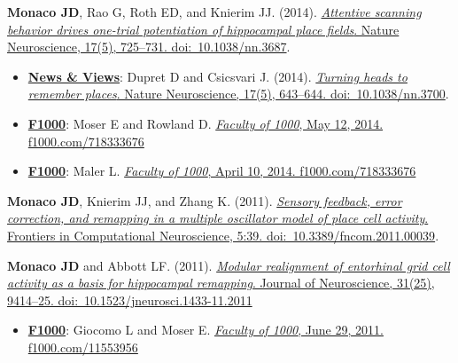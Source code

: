 \documentclass[10pt]{article}
\begin{document}
\begin{description}
\item \textbf{Monaco JD}, Rao G, Roth ED, and Knierim JJ. (2014). \href{http://dx.doi.org/10.1038/nn.3687}{\emph{Attentive scanning behavior drives one-trial potentiation of hippocampal place fields}. Nature Neuroscience, 17(5), 725--731. doi:~10.1038/nn.3687}.
\begin{itemize}
  \item \underline{\bf News \& Views}: Dupret D and Csicsvari J. (2014). \href{http://dx.doi.org/10.1038/nn.3700}{\emph{Turning heads to remember places}. Nature Neuroscience, 17(5), 643--644. doi:~10.1038/nn.3700}.
    \item \underline{\bf F1000}: Moser E and Rowland D. \href{http://f1000prime.com/718333676#eval793494783}{\emph{Faculty of 1000}, May 12, 2014. f1000.com/718333676}
    \item \underline{\bf F1000}: Maler L. \href{http://f1000prime.com/718333676#eval793493493}{\emph{Faculty of 1000}, April 10, 2014. f1000.com/718333676}
\end{itemize}
\item \textbf{Monaco JD}, Knierim JJ, and Zhang K. (2011). \href{http://dx.doi.org/10.3389/fncom.2011.00039}{\emph{Sensory feedback, error correction, and remapping in a multiple oscillator model of place cell activity}. Frontiers in Computational Neuroscience, 5:39. doi:~10.3389/fncom.2011.00039}.
\item \textbf{Monaco JD} and Abbott LF. (2011). \href{http://dx.doi.org/10.1523/JNEUROSCI.1433-11.2011}{\emph{Modular realignment of entorhinal grid cell activity as a basis for hippocampal remapping}. Journal of Neuroscience, 31(25), 9414--25. doi:~10.1523/jneurosci.1433-11.2011}
\begin{itemize}
    \item \underline{\bf F1000}: Giocomo L and Moser E. \href{http://f1000.com/11553956}{\emph{Faculty of 1000}, June 29, 2011. f1000.com/11553956}
\end{itemize}
\end{description}
\end{document}
